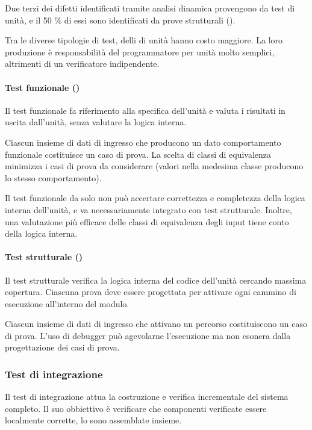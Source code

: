Due terzi dei difetti identificati tramite analisi dinamica provengono da test
di unità, e il 50 \% di essi sono identificati da prove strutturali
().

Tra le diverse tipologie di test, delli di unità hanno costo maggiore. La loro
produzione è responsabilità del programmatore per unità molto semplici,
altrimenti di un verificatore indipendente.

\paragraph{Test funzionale ()}
\label{par:test_funzionale}

Il test funzionale fa riferimento alla specifica dell'unità e valuta i risultati
in uscita dall'unità, senza valutare la logica interna.

Ciascun insieme di dati di ingresso che producono un dato comportamento
funzionale costituisce un caso di prova. La scelta di classi di equivalenza
minimizza i casi di prova da considerare (valori nella medesima classe producono
lo stesso comportamento).

Il test funzionale da solo non può accertare correttezza e completezza della
logica interna dell'unità, e va necessariamente integrato con test strutturale.
Inoltre, una valutazione più efficace delle classi di equivalenza degli input
tiene conto della logica interna.

\paragraph{Test strutturale ()}
\label{par:test_strutturale}

Il test strutturale verifica la logica interna del codice dell'unità cercando
massima copertura. Ciascuna prova deve essere progettata per attivare ogni
cammino di esecuzione all'interno del modulo.

Ciascun insieme di dati di ingresso che attivano un percorso costituiscono un
caso di prova. L'uso di debugger può agevolarne l'esecuzione ma non esonera
dalla progettazione dei casi di prova.

\subsubsection{Test di integrazione}
\label{ssub:test_di_integrazione}

Il test di integrazione attua la costruzione e verifica incrementale del sistema
completo. Il suo obbiettivo è verificare che componenti verificate essere
localmente corrette, lo sono assemblate insieme.

